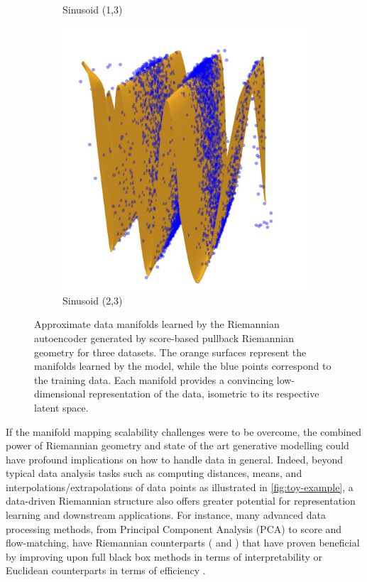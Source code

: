\begin{figure}[t]
\begin{subfigure}[b]{0.32\textwidth}
        \caption{Sinusoid (1,3)}
    \end{subfigure}
    \hfill
    \begin{subfigure}[b]{0.32\textwidth}
        \centering
        \includegraphics[width=\textwidth]{Chapter5/results/visualisations/RAE/projections/sinusoid_2_3/riemannian_autoencoder.jpg}
        \caption{Sinusoid (2,3)}
    \end{subfigure}

    \caption{
        Approximate data manifolds learned by the Riemannian autoencoder generated by score-based pullback Riemannian geometry for three datasets. The orange surfaces represent the manifolds learned by the model, while the blue points correspond to the training data. Each manifold provides a convincing low-dimensional representation of the data, isometric to its respective latent space.
    }
    \label{fig:learned_charts}
\end{figure}

If the manifold mapping scalability challenges were to be overcome, the combined power of Riemannian geometry and state of the art generative modelling could have profound implications on how to handle data in general. 
Indeed, beyond typical data analysis tasks such as computing distances, means, and interpolations/extrapolations of data points as illustrated in \ref{fig:toy-example}, a data-driven Riemannian structure also offers greater potential for representation learning and downstream applications. For instance, many advanced data processing methods, from Principal Component Analysis (PCA) to score and flow-matching, have Riemannian counterparts (\cite{diepeveen2023curvature,fletcher2004principal} and \cite{chen2023riemannian,huang2022riemannian}) that have proven beneficial by improving upon full black box methods in terms of interpretability \cite{diepeveen2024pulling} or Euclidean counterparts in terms of efficiency \cite{kapusniak2024metricflowmatchingsmooth}. 
 
